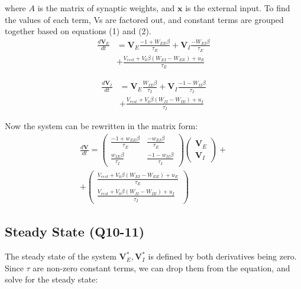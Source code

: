 \documentclass[10pt,twocolumn]{article}
\begin{document}
where $A$ is the matrix of synaptic weights,
and $\textbf{x}$ is the external input.
To find the values of each term, Vs are factored out, and
constant terms are grouped together based on equations (1) and (2).
$$
    \begin{align*}
        \frac{d\textbf{V}_E}{dt} & = \textbf{V}_E \boxed{\frac{-1 + W_{EE}\beta}{\tau_E}}
        + \textbf{V}_I \boxed{\frac{-W_{EI}\beta}{\tau_E}}                                           \\
                                 & + \boxed{\frac{V_{rest} + V_0\beta(W_{EI}-W_{EE}) + u_E}{\tau_E}}
    \end{align*}
$$

$$
    \begin{align*}
        \frac{d\textbf{V}_I}{dt} & = \textbf{V}_E\boxed{\frac{W_{IE}\beta}{\tau_I}}
        + \textbf{V}_I\boxed{\frac{-1 - W_{II}\beta}{\tau_I}}                                        \\
                                 & + \boxed{\frac{V_{rest} + V_0\beta(W_{II}-W_{IE}) + u_I}{\tau_I}}
    \end{align*}
$$

Now the system can be rewritten in the matrix form:
$$
    \begin{align*}
        \frac{d\textbf{V}}{dt}
        =
        \begin{pmatrix}
            \frac{-1 + w_{EE}\beta}{\tau_E} & \frac{-w_{EI}\beta}{\tau_E}     \\
            \frac{w_{IE}\beta}{\tau_I}      & \frac{-1 - w_{II}\beta}{\tau_I}
        \end{pmatrix}
        \begin{pmatrix}
            \textbf{V}_E \\ \textbf{V}_I
        \end{pmatrix}+
        \\
        +
        \begin{pmatrix}
            \frac{V_{rest} + V_0\beta(W_{EI}-W_{EE}) + u_E}{\tau_E} \\
            \frac{V_{rest} + V_0\beta(W_{II}-W_{IE}) + u_I}{\tau_I}
        \end{pmatrix}
    \end{align*}
$$


\subsection{Steady State (Q10-11)}
The steady state of the system $\textbf{V}^\ast_E,\textbf{V}^\ast_I$ is defined  by
both derivatives being zero. Since $\tau$ are non-zero constant terms, we can drop
them from the equation, and solve for the steady state:
\end{document}
